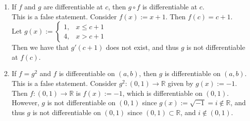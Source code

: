 \documentclass[12pt,letterpaper]{article}
\newcommand{\R}{\mathbb{R}}
\theoremstyle{case}
\theoremstyle{definition}
\newtheorem{theorem*}{Theorem}
\begin{document}
\begin{enumerate}
\begin{enumerate}
\begin{theorem*}
\begin{enumerate}
					\item The function $f+g$ is differentiable at $c$, and 
					\[(f+g)'(c) = f'(c)+g'(c)\]
					
					\item (Product Rule) The function $fg$ is differentiable at $c$, and
					\[(fg)'(c) = f'(c)g(c) + f(c)g'(c).\]
					
					\item (Quotient Rule) If $g(c) \neq 0$, then the function $f/g$ is differentiable at $c$, and
					\[\left( \frac{f}{g}\right)'(c) = \frac{f'(c)g(c)-f(c)g'(c)}{(g(c))^2}\]
				\end{enumerate}
			\end{theorem*}	
			\item If $f$ and $g$ are differentiable at $c$, then $g \circ f$ is differentiable at $c$.\\
			
			This is a false statement. Consider $f(x):=x+1$. Then $f(c)=c+1$.\\
			
			Let $g(x):=\begin{cases}
				1, &x\leq c+1 \\
				4, &x > c+1
			\end{cases}$\\
			
			Then we have that $g'(c+1)$ does not exist, and thus $g$ is not differentiable at $f(c)$.\\
			\item If $f=g^2$ and $f$ is differentiable on $(a,b)$, then $g$ is differentiable on $(a,b)$.\\
			
			This is a false statement. Consider $g^2:(0,1) \to \R$ given by $g(x):=-1$. Then $f:(0,1) \to \R$ is $f(x):=-1$, which is differentiable on $(0,1)$. However, $g$ is not differentiable on $(0,1)$ since $g(x):=\sqrt{-1}=i \notin \R$, and thus $g$ is not differentiable on $(0,1)$ since $(0,1) \subset \R$, and $i \notin (0,1)$.
		\end{enumerate}
	\end{enumerate}
\end{document}
